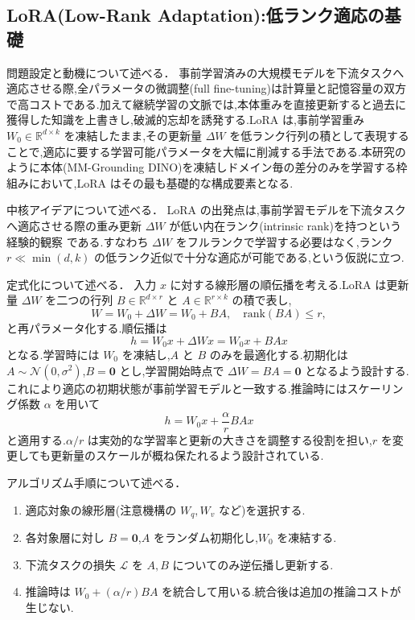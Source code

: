 \subsection{LoRA(Low-Rank Adaptation):低ランク適応の基礎}

問題設定と動機について述べる．
事前学習済みの大規模モデルを下流タスクへ適応させる際,全パラメータの微調整(full fine-tuning)は計算量と記憶容量の双方で高コストである.加えて継続学習の文脈では,本体重みを直接更新すると過去に獲得した知識を上書きし,破滅的忘却を誘発する.LoRA \cite{lora} は,事前学習重み $W_0 \in \mathbb{R}^{d \times k}$ を凍結したまま,その更新量 $\Delta W$ を低ランク行列の積として表現することで,適応に要する学習可能パラメータを大幅に削減する手法である.本研究のように本体(MM-Grounding DINO)を凍結しドメイン毎の差分のみを学習する枠組みにおいて,LoRA はその最も基礎的な構成要素となる.

中核アイデアについて述べる．
LoRA の出発点は,事前学習モデルを下流タスクへ適応させる際の重み更新 $\Delta W$ が低い内在ランク(intrinsic rank)を持つという経験的観察 \cite{intrinsicdim} である.すなわち $\Delta W$ をフルランクで学習する必要はなく,ランク $r \ll \min(d,k)$ の低ランク近似で十分な適応が可能である,という仮説に立つ.

定式化について述べる．
入力 $x$ に対する線形層の順伝播を考える.LoRA は更新量 $\Delta W$ を二つの行列 $B \in \mathbb{R}^{d \times r}$ と $A \in \mathbb{R}^{r \times k}$ の積で表し,
\begin{equation}
W = W_0 + \Delta W = W_0 + BA, \quad \mathrm{rank}(BA) \leq r,
\end{equation}
と再パラメータ化する.順伝播は
\begin{equation}
h = W_0 x + \Delta W x = W_0 x + B A x
\end{equation}
となる.学習時には $W_0$ を凍結し,$A$ と $B$ のみを最適化する.初期化は $A \sim \mathcal{N}(0,\sigma^2)$,$B = \mathbf{0}$ とし,学習開始時点で $\Delta W = BA = \mathbf{0}$ となるよう設計する.これにより適応の初期状態が事前学習モデルと一致する.推論時にはスケーリング係数 $\alpha$ を用いて
\begin{equation}
h = W_0 x + \frac{\alpha}{r} B A x
\end{equation}
と適用する.$\alpha / r$ は実効的な学習率と更新の大きさを調整する役割を担い,$r$ を変更しても更新量のスケールが概ね保たれるよう設計されている.

アルゴリズム手順について述べる．
\begin{enumerate}
\item 適応対象の線形層(注意機構の $W_q, W_v$ など)を選択する.
\item 各対象層に対し $B = \mathbf{0}$,$A$ をランダム初期化し,$W_0$ を凍結する.
\item 下流タスクの損失 $\mathcal{L}$ を $A, B$ についてのみ逆伝播し更新する.
\item 推論時は $W_0 + (\alpha/r) BA$ を統合して用いる.統合後は追加の推論コストが生じない.
\end{enumerate}

